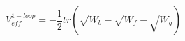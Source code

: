 \begin{equation}\label{VF2}
V_{eff}^{1-loop}=-\frac{1}{2} tr ( \sqrt{W_b} - \sqrt{W_f} -
\sqrt{W_g} )
\end{equation}

